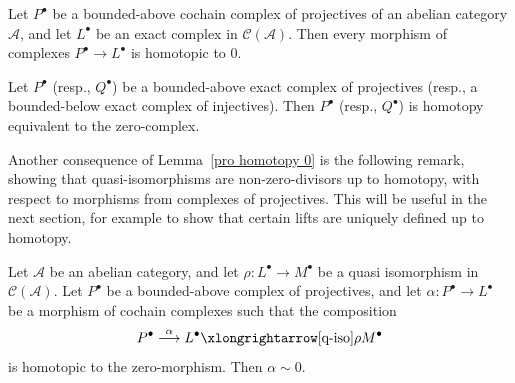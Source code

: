 \begin{corollary}\label{proj mor exact homo 0}
Let $P^\bullet$ be a bounded-above cochain complex of projectives of an abelian category $\mathcal{A}$, and let $L^\bullet$ be an exact complex in $\mathcal{C}(\mathcal{A})$. Then every morphism of complexes $P^\bullet\to L^\bullet$ is homotopic to $0$.
\end{corollary}
\begin{corollary}
Let $P^\bullet$ (resp., $Q^\bullet$) be a bounded-above exact complex of projectives (resp., a bounded-below exact complex of injectives). Then $P^\bullet$ (resp., $Q^\bullet$) is homotopy equivalent to the zero-complex.
\end{corollary}
Another consequence of Lemma~\ref{pro homotopy 0} is the following remark, showing that quasi-isomorphisms are non-zero-divisors up to homotopy, with respect to morphisms from complexes of projectives. This will be useful in the next section, for example to show that certain lifts are uniquely defined up to homotopy.
\begin{lemma}\label{quasi nonzero div}
Let $\mathcal{A}$ be an abelian category, and let $\rho:L^\bullet\to M^\bullet$ be a quasi isomorphism
in $\mathcal{C}(\mathcal{A})$. Let $P^\bullet$ be a bounded-above complex of projectives, and let $\alpha:P^\bullet\to L^\bullet$ be a morphism of cochain complexes such that the composition
\[P^\bullet\stackrel{\alpha}{\longrightarrow}L^\bullet\xlongrightarrow[\text{q-iso}]{\rho}M^\bullet\]
is homotopic to the zero-morphism. Then $\alpha\sim0$.
\end{lemma}
